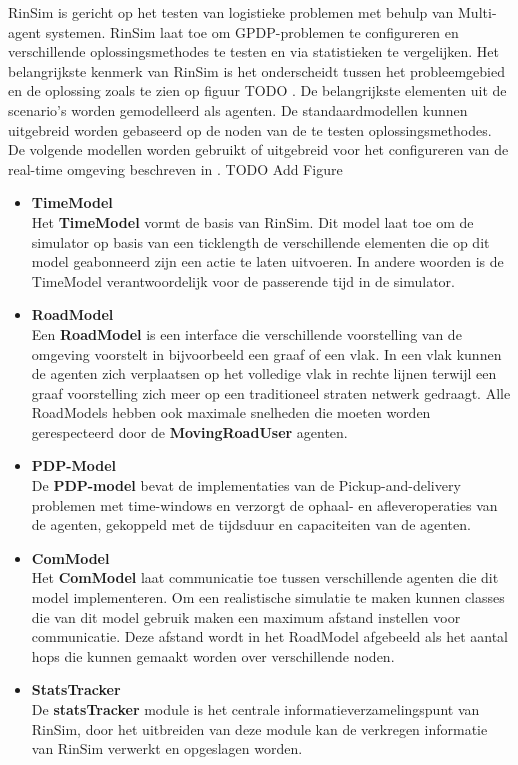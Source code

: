 RinSim is gericht op het testen van logistieke problemen met behulp van Multi-agent systemen. RinSim laat toe om GPDP-problemen te configureren en verschillende oplossingsmethodes te testen en via statistieken te vergelijken. Het belangrijkste kenmerk van RinSim is het onderscheidt tussen het probleemgebied en de oplossing zoals te zien op figuur TODO \cite{Figure?}. De belangrijkste elementen uit de scenario’s worden gemodelleerd als agenten. De standaardmodellen kunnen uitgebreid worden gebaseerd op de noden van de te testen oplossingsmethodes. De volgende modellen worden gebruikt of uitgebreid voor het configureren van de real-time omgeving beschreven in \cite{CaseStudy}.
TODO Add Figure
\begin{itemize}
\item \textbf{TimeModel}\\
Het \textbf{TimeModel} vormt de basis van RinSim. Dit model laat toe om de simulator op basis van een ticklength de verschillende elementen die op dit model geabonneerd zijn een actie te laten uitvoeren. In andere woorden is de TimeModel verantwoordelijk voor de passerende tijd in de simulator.
\item \textbf{RoadModel}\\
Een \textbf{RoadModel} is een interface die verschillende voorstelling van de omgeving voorstelt in bijvoorbeeld een graaf of een vlak. In een vlak kunnen de agenten zich verplaatsen op het volledige vlak in rechte lijnen terwijl een graaf voorstelling zich meer op een traditioneel straten netwerk gedraagt. Alle RoadModels hebben ook maximale snelheden die moeten worden gerespecteerd door de \textbf{MovingRoadUser} agenten. 
\item \textbf{PDP-Model}\\
De \textbf{PDP-model} bevat de implementaties van de Pickup-and-delivery problemen met time-windows en verzorgt de ophaal- en afleveroperaties van de agenten, gekoppeld met de tijdsduur en capaciteiten van de agenten.
\item \textbf{ComModel}\\
Het \textbf{ComModel} laat communicatie toe tussen verschillende agenten die dit model implementeren. Om een realistische simulatie te maken kunnen classes die van dit model gebruik maken een maximum afstand instellen voor communicatie. Deze afstand wordt in het RoadModel afgebeeld als het aantal hops die kunnen gemaakt worden over verschillende noden.
\item \textbf{StatsTracker}\\
De \textbf{statsTracker} module is het centrale informatieverzamelingspunt van RinSim, door het uitbreiden van deze module kan de verkregen informatie van RinSim verwerkt en opgeslagen worden.
\end{itemize}

